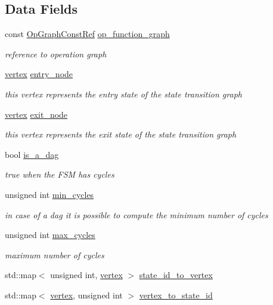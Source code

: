 \subsection*{Data Fields}
\begin{DoxyCompactItemize}
\item 
const \hyperlink{op__graph_8hpp_a9a0b240622c47584bee6951a6f5de746}{Op\+Graph\+Const\+Ref} \hyperlink{structStateTransitionGraphInfo_ae327d741c56cc18d06bba996d9fdc381}{op\+\_\+function\+\_\+graph}
\begin{DoxyCompactList}\small\item\em reference to operation graph \end{DoxyCompactList}\item 
\hyperlink{graph_8hpp_abefdcf0544e601805af44eca032cca14}{vertex} \hyperlink{structStateTransitionGraphInfo_aceaab2d757838c7b009e6957ddf748d8}{entry\+\_\+node}
\begin{DoxyCompactList}\small\item\em this vertex represents the entry state of the state transition graph \end{DoxyCompactList}\item 
\hyperlink{graph_8hpp_abefdcf0544e601805af44eca032cca14}{vertex} \hyperlink{structStateTransitionGraphInfo_a2695b968ef457ffc7b83e8065821bc6c}{exit\+\_\+node}
\begin{DoxyCompactList}\small\item\em this vertex represents the exit state of the state transition graph \end{DoxyCompactList}\item 
bool \hyperlink{structStateTransitionGraphInfo_a38c6f9716d82974327d60e3ec73d8166}{is\+\_\+a\+\_\+dag}
\begin{DoxyCompactList}\small\item\em true when the F\+SM has cycles \end{DoxyCompactList}\item 
unsigned int \hyperlink{structStateTransitionGraphInfo_a6527ba8e1d5bb17020603df3a0e8dfe6}{min\+\_\+cycles}
\begin{DoxyCompactList}\small\item\em in case of a dag it is possible to compute the minimum number of cycles \end{DoxyCompactList}\item 
unsigned int \hyperlink{structStateTransitionGraphInfo_a8363486b9a8bd6132e7860eb4b9a76f4}{max\+\_\+cycles}
\begin{DoxyCompactList}\small\item\em maximum number of cycles \end{DoxyCompactList}\item 
std\+::map$<$ unsigned int, \hyperlink{graph_8hpp_abefdcf0544e601805af44eca032cca14}{vertex} $>$ \hyperlink{structStateTransitionGraphInfo_aca3182934ee304b7cf8b2b5a1b98cbdb}{state\+\_\+id\+\_\+to\+\_\+vertex}
\item 
std\+::map$<$ \hyperlink{graph_8hpp_abefdcf0544e601805af44eca032cca14}{vertex}, unsigned int $>$ \hyperlink{structStateTransitionGraphInfo_aea24a9a16db997ca57c051c896fe1ed8}{vertex\+\_\+to\+\_\+state\+\_\+id}
\end{DoxyCompactItemize}
